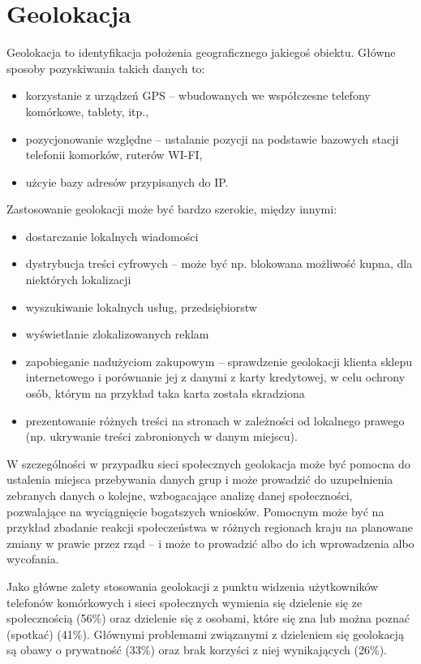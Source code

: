 \clearpage\section{Geolokacja}
Geolokacja to identyfikacja położenia geograficznego jakiegoś obiektu.
Główne sposoby pozyskiwania takich danych to:
\begin{itemize}
  \item korzystanie z urządzeń GPS -- wbudowanych we współczesne telefony
komórkowe, tablety, itp.,
  \item pozycjonowanie względne -- ustalanie pozycji na podstawie bazowych stacji
telefonii komorków, ruterów WI-FI,
\item użcyie bazy adresów przypisanych do IP.
\end{itemize} 
Zastosowanie geolokacji może być bardzo szerokie, między innymi:
\begin{itemize}
  \item dostarczanie lokalnych wiadomości
  \item dystrybucja treści cyfrowych -- może być np. blokowana możliwość kupna, 
  dla niektórych lokalizacji
  \item wyszukiwanie lokalnych usług, przedsiębiorstw
  \item wyświetlanie zlokalizowanych reklam
  \item zapobieganie nadużyciom zakupowym -- sprawdzenie geolokacji
  klienta sklepu internetowego i porównanie jej z danymi z karty kredytowej,
  w celu ochrony osób, którym na przykład taka karta została skradziona
  \item prezentowanie różnych treści na stronach w zależności od lokalnego
  prawego (np. ukrywanie treści zabronionych w danym miejscu).
\end{itemize}
W szczególności w przypadku sieci społecznych geolokacja może być pomocna do
ustalenia miejsca przebywania danych grup i może prowadzić
do uzupełnienia zebranych danych o kolejne, wzbogacające analizę danej społeczności,
pozwalające na wyciągnięcie bogatszych wniosków. Pomocnym może być na przykład
zbadanie reakcji społeczeństwa w różnych regionach kraju na planowane zmiany
w prawie przez rząd -- i może to prowadzić albo do ich wprowadzenia albo wycofania.

Jako główne zalety stosowania geolokacji \cite{lostInGeolocation} z punktu
widzenia użytkowników telefonów komórkowych i sieci społecznych wymienia się
dzielenie się ze społecznością (56\%) oraz dzielenie się z osobami, które się 
zna lub można poznać (spotkać) (41\%). Głównymi problemami związanymi z 
dzieleniem się geolokacją są obawy o prywatność (33\%) oraz brak korzyści z niej
wynikających (26\%).



